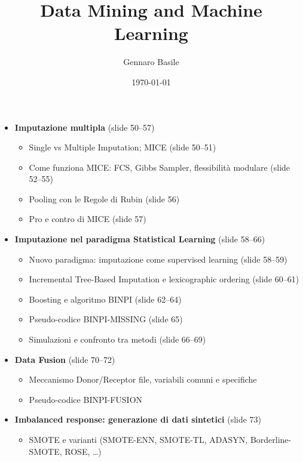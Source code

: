 \documentclass[11pt]{article}
\title{\Huge Data Mining and Machine Learning}
\author{\Large Gennaro Basile}
\date{\today}
\theoremstyle{smallexample}
\begin{document}
\maketitle
{}
\captionsetup[figure]{labelfont=bf}

\pagebreak

\tableofcontents
\pagebreak

\begin{itemize}
  \item \textbf{Imputazione multipla} (slide 50--57)
    \begin{itemize}
      \item Single vs Multiple Imputation; MICE (slide 50--51)
      \item Come funziona MICE: FCS, Gibbs Sampler, flessibilità modulare (slide 52--55)
      \item Pooling con le Regole di Rubin (slide 56)
      \item Pro e contro di MICE (slide 57)
    \end{itemize}

  \item \textbf{Imputazione nel paradigma Statistical Learning} (slide 58--66)
    \begin{itemize}
      \item Nuovo paradigma: imputazione come supervised learning (slide 58--59)
      \item Incremental Tree-Based Imputation e lexicographic ordering (slide 60--61)
      \item Boosting e algoritmo BINPI (slide 62--64)
      \item Pseudo-codice BINPI-MISSING (slide 65)
      \item Simulazioni e confronto tra metodi (slide 66--69)
    \end{itemize}

  \item \textbf{Data Fusion} (slide 70--72)
    \begin{itemize}
      \item Meccanismo Donor/Receptor file, variabili comuni e specifiche
      \item Pseudo-codice BINPI-FUSION
    \end{itemize}

  \item \textbf{Imbalanced response: generazione di dati sintetici} (slide 73)
    \begin{itemize}
      \item SMOTE e varianti (SMOTE-ENN, SMOTE-TL, ADASYN, Borderline-SMOTE, ROSE, \ldots)
    \end{itemize}


\end{itemize}
\end{document}
